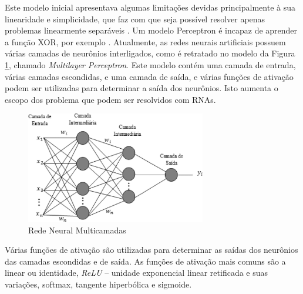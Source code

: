 Este modelo inicial apresentava algumas limitações devidas principalmente à sua linearidade e simplicidade, que faz com que seja possível resolver apenas problemas linearmente separáveis \cite{braga2000redes}. Um modelo Perceptron é incapaz de aprender a função XOR, por exemplo \cite{goodfellow2016deep}. Atualmente, as redes neurais artificiais possuem várias camadas de neurônios interligados, como é retratado no modelo da Figura \ref{fig:mlp}, chamado \emph{Multilayer Perceptron}. Este modelo contém uma camada de entrada, várias camadas escondidas, e uma camada de saída, e várias funções de ativação podem ser utilizadas para determinar a saída dos neurônios. Isto aumenta o escopo dos problema que podem ser resolvidos com RNAs. 

\begin{figure}[ht]
	\centering
	\includegraphics[width=0.7\textwidth]{img/mlprna.jpg}
	\caption{Rede Neural Multicamadas}
	\label{fig:mlp}
\end{figure}

Várias funções de ativação são utilizadas para determinar as saídas dos neurônios das camadas escondidas e de saída. As funções de ativação mais comuns são a linear ou identidade, \emph{ReLU} -- unidade exponencial linear retificada e suas variações, softmax, tangente hiperbólica e sigmoide.

